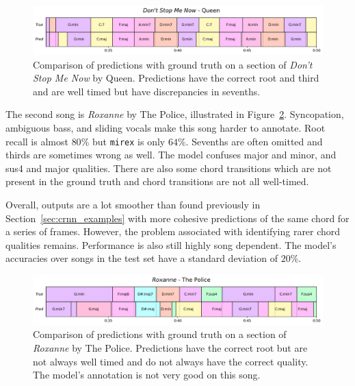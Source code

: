 \begin{figure}[H]
    \centering
    \includegraphics[width=1.0\textwidth]{figures/dontstopmenow.png}
    \caption{Comparison of predictions with ground truth on a section of \emph{Don't Stop Me Now} by Queen. Predictions have the correct root and third and are well timed but have discrepancies in sevenths. }\label{fig:dontstopmenow}
\end{figure}

The second song is \emph{Roxanne} by The Police, illustrated in Figure~\ref{fig:roxanne}. Syncopation, ambiguous bass, and sliding vocals make this song harder to annotate. Root recall is almost $80\%$ but \texttt{mirex} is only $64\%$. Sevenths are often omitted and thirds are sometimes wrong as well. The model confuses major and minor, and sus4 and major qualities. There are also some chord transitions which are not present in the ground truth and chord transitions are not all well-timed.

Overall, outputs are a lot smoother than found previously in Section~\ref{sec:crnn_examples} with more cohesive predictions of the same chord for a series of frames. However, the problem associated with identifying rarer chord qualities remains. Performance is also still highly song dependent. The model's accuracies over songs in the test set have a standard deviation of $20\%$. 

\begin{figure}[H]
    \centering
    \includegraphics[width=1.0\textwidth]{figures/roxanne_thepolice.png}
    \caption{Comparison of predictions with ground truth on a section of \emph{Roxanne} by The Police. Predictions have the correct root but are not always well timed and do not always have the correct quality. The model's annotation is not very good on this song. }\label{fig:roxanne}
\end{figure}

